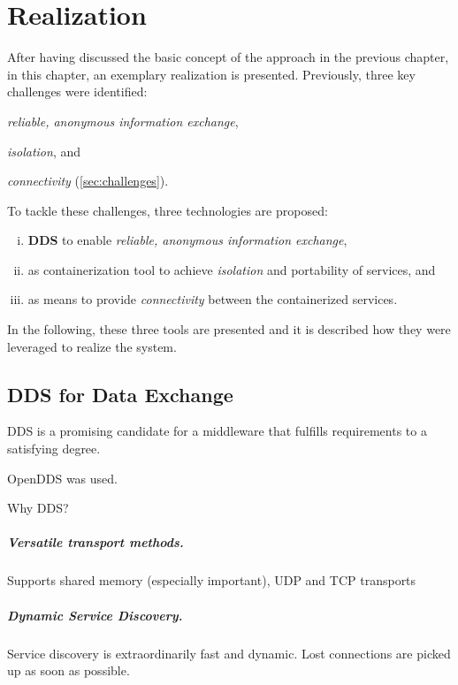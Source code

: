 \chapter{Realization} \label{chapter:realization}
After having discussed the basic concept of the approach in the previous chapter, in this chapter, an exemplary realization is presented. Previously, three key challenges were identified:
\begin{inparaenum}[(i)]
  \item \emph{reliable, anonymous information exchange},
  \item \emph{isolation}, and
  \item \emph{connectivity} (\cf \ref{sec:challenges}). 
\end{inparaenum}
To tackle these challenges, three technologies are proposed:

\begin{enumerate}[(i)]
\item \textbf{DDS} to enable \emph{reliable, anonymous information exchange},
\item \textbf{\docker} as containerization tool to achieve \emph{isolation} and portability of services, and
\item \textbf{\wnet} as means to provide \emph{connectivity} between the containerized services.
\end{enumerate}

In the following, these three tools are presented and it is described how they were leveraged to realize the system.

\section{DDS for Data Exchange}

DDS is a promising candidate for a middleware that fulfills requirements to a satisfying degree.

OpenDDS was used.

Why DDS?

\paragraph{Versatile transport methods.} Supports shared memory (especially important), UDP and TCP transports

\paragraph{Dynamic Service Discovery.} Service discovery is extraordinarily fast and dynamic. Lost connections are picked up as soon as possible.

